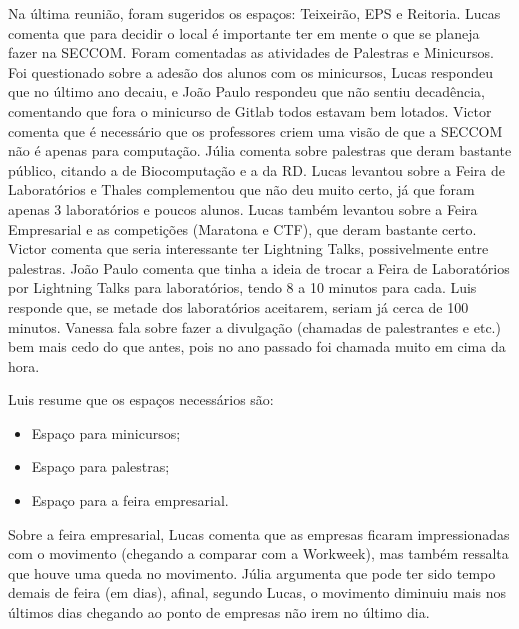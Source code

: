 \documentclass{ata-calico}
\begin{document}

Na última reunião, foram sugeridos os espaços: Teixeirão, EPS e Reitoria. Lucas
comenta que para decidir o local é importante ter em mente o que se planeja
fazer na SECCOM\@. Foram comentadas as atividades de Palestras e Minicursos.
Foi questionado sobre a adesão dos alunos com os minicursos, Lucas respondeu
que no último ano decaiu, e João Paulo respondeu que não sentiu decadência,
comentando que fora o minicurso de Gitlab todos estavam bem lotados. Victor
comenta que é necessário que os professores criem uma visão de que a SECCOM não
é apenas para computação. Júlia comenta sobre palestras que deram bastante
público, citando a de Biocomputação e a da RD\@. Lucas levantou sobre a Feira
de Laboratórios e Thales complementou que não deu muito certo, já que foram
apenas 3 laboratórios e poucos alunos. Lucas também levantou sobre a Feira
Empresarial e as competições (Maratona e CTF), que deram bastante certo. Victor
comenta que seria interessante ter Lightning Talks, possivelmente entre
palestras. João Paulo comenta que tinha a ideia de trocar a Feira de
Laboratórios por Lightning Talks para laboratórios, tendo 8 a 10 minutos para
cada. Luis responde que, se metade dos laboratórios aceitarem, seriam já cerca
de 100 minutos. Vanessa fala sobre fazer a divulgação (chamadas de palestrantes
e etc.) bem mais cedo do que antes, pois no ano passado foi chamada muito em
cima da hora.

Luis resume que os espaços necessários são:

\begin{itemize}
    \item Espaço para minicursos;
    \item Espaço para palestras;
    \item Espaço para a feira empresarial.
\end{itemize}

Sobre a feira empresarial, Lucas comenta que as empresas ficaram impressionadas
com o movimento (chegando a comparar com a Workweek), mas também ressalta que
houve uma queda no movimento. Júlia argumenta que pode ter sido tempo demais de
feira (em dias), afinal, segundo Lucas, o movimento diminuiu mais nos últimos
dias chegando ao ponto de empresas não irem no último dia.
\end{document}
